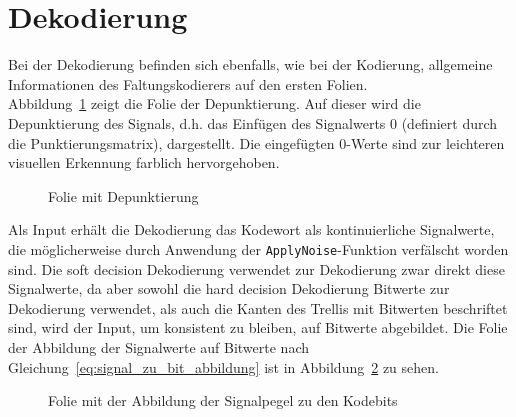 \section{Dekodierung}
\label{kapitel:visualisierung_dekodierung}
Bei der Dekodierung befinden sich ebenfalls, wie bei der Kodierung, allgemeine Informationen des Faltungskodierers auf den ersten Folien.
\\
Abbildung~\ref{abb:folie_depunktierung} zeigt die Folie der Depunktierung. Auf dieser wird die Depunktierung des Signals, d.h. das Einfügen des Signalwerts 0 (definiert durch die Punktierungsmatrix), dargestellt. Die eingefügten 0-Werte sind zur leichteren visuellen Erkennung farblich hervorgehoben.
\begin{figure}[th]
	\centering
	\caption{Folie mit Depunktierung}
	\label{abb:folie_depunktierung}
\end{figure}
Als Input erhält die Dekodierung das Kodewort als kontinuierliche Signalwerte, die möglicherweise durch Anwendung der \texttt{ApplyNoise}-Funktion verfälscht worden sind. Die soft decision Dekodierung verwendet zur Dekodierung zwar direkt diese Signalwerte, da aber sowohl die hard decision Dekodierung Bitwerte zur Dekodierung verwendet, als auch die Kanten des Trellis mit Bitwerten beschriftet sind, wird der Input, um konsistent zu bleiben, auf Bitwerte abgebildet. Die Folie der Abbildung der Signalwerte auf Bitwerte nach Gleichung~\eqref{eq:signal_zu_bit_abbildung} ist in Abbildung~\ref{abb:folie_signal_zu_bit_abbildung} zu sehen.
\begin{figure}[th]
	\centering
	\caption{Folie mit der Abbildung der Signalpegel zu den Kodebits}
	\label{abb:folie_signal_zu_bit_abbildung}
\end{figure}
